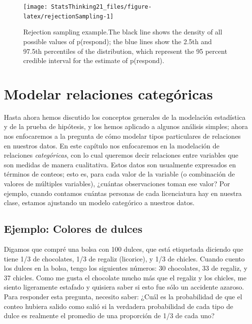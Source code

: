 \documentclass[
  12pt,
]{book}
\begin{document}
\begin{figure}
\texttt{[image: StatsThinking21\_files/figure-latex/rejectionSampling-1]} \caption{Rejection sampling example.The black line shows the density of all possible values of p(respond); the blue lines show the 2.5th and 97.5th percentiles of the distribution, which represent the 95 percent credible interval for the estimate of p(respond).}\label{fig:rejectionSampling}
\end{figure}

\hypertarget{modelar-relaciones-categuxf3ricas}{%
\chapter{Modelar relaciones categóricas}\label{modelar-relaciones-categuxf3ricas}}

Hasta ahora hemos discutido los conceptos generales de la modelación estadística y de la prueba de hipótesis, y los hemos aplicado a algunos análisis simples; ahora nos enfocaremos a la pregunta de cómo modelar tipos particulares de relaciones en nuestros datos. En este capítulo nos enfocaremos en la modelación de relaciones \emph{categóricas}, con lo cual queremos decir relaciones entre variables que son medidas de manera cualitativa. Estos datos son usualmente expresados en términos de conteos; esto es, para cada valor de la variable (o combinación de valores de múltiples variables), ¿cuántas observaciones toman ese valor? Por ejemplo, cuando contamos cuántas personas de cada licenciatura hay en nuestra clase, estamos ajustando un modelo categórico a nuestros datos.

\hypertarget{ejemplo-colores-de-dulces}{%
\section{Ejemplo: Colores de dulces}\label{ejemplo-colores-de-dulces}}

Digamos que compré una bolsa con 100 dulces, que está etiquetada diciendo que tiene 1/3 de chocolates, 1/3 de regaliz (licorice), y 1/3 de chicles. Cuando cuento los dulces en la bolsa, tengo los siguientes números: 30 chocolates, 33 de regaliz, y 37 chicles. Como me gusta el chocolate mucho más que el regaliz y los chicles, me siento ligeramente estafado y quisiera saber si esto fue sólo un accidente azaroso. Para responder esta pregunta, necesito saber: ¿Cuál es la probabilidad de que el conteo hubiera salido como salió si la verdadera probabilidad de cada tipo de dulce es realmente el promedio de una proporción de 1/3 de cada uno?
\end{document}
